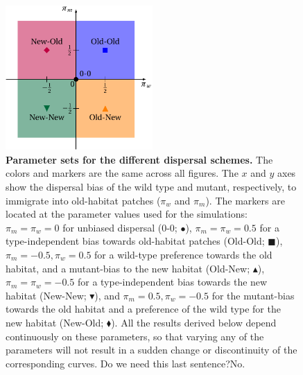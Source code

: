 \documentclass[a4paper,11pt]{article}
\begin{document}
\begin{figure}[t]
	\centering
	\includegraphics[width=0.5\textwidth]{fig1.pdf}
	\caption{\textbf{Parameter sets for the different dispersal schemes.} \small The colors and markers are the same across all figures. The $x$ and $y$ axes show the dispersal bias of the wild type and mutant, respectively, to immigrate into old-habitat patches ($\pi_w$ and $\pi_m$). The markers are located at the parameter values used for the simulations: $\pi_m=\pi_w=0$ for unbiased dispersal (0-0; {\Large $\bullet$}), $\pi_m=\pi_w=0.5$ for a type-independent bias towards old-habitat patches (Old-Old; {\color{blue} $\blacksquare$}), $\pi_m=-0.5,\pi_w=0.5$ for a wild-type preference towards the old habitat, and a mutant-bias to the new habitat (Old-New; {\color{orange}$\blacktriangle$}), $\pi_m=\pi_w=-0.5$ for a type-independent bias towards the new habitat (New-New; {\color{darkgreen}$\blacktriangledown$}), and $\pi_m=0.5,\pi_w=-0.5$ for the mutant-bias towards the old habitat and a preference of the wild type for the new habitat (New-Old; {\color{purple}$\blacklozenge$}). All the results derived below depend continuously on these parameters, so that varying any of the parameters will not result in a sudden change or discontinuity of the corresponding curves. {\color{orange} Do we need this last sentence?\color{blue}No.}}
	\label{fig:disp_schemes}
\end{figure}
\end{document}
